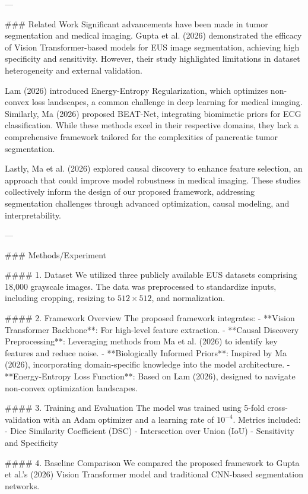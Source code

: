 ---

### Related Work
Significant advancements have been made in tumor segmentation and medical imaging. Gupta et al. (2026) demonstrated the efficacy of Vision Transformer-based models for EUS image segmentation, achieving high specificity and sensitivity. However, their study highlighted limitations in dataset heterogeneity and external validation.

Lam (2026) introduced Energy-Entropy Regularization, which optimizes non-convex loss landscapes, a common challenge in deep learning for medical imaging. Similarly, Ma (2026) proposed BEAT-Net, integrating biomimetic priors for ECG classification. While these methods excel in their respective domains, they lack a comprehensive framework tailored for the complexities of pancreatic tumor segmentation.

Lastly, Ma et al. (2026) explored causal discovery to enhance feature selection, an approach that could improve model robustness in medical imaging. These studies collectively inform the design of our proposed framework, addressing segmentation challenges through advanced optimization, causal modeling, and interpretability.

---

### Methods/Experiment

#### 1. Dataset
We utilized three publicly available EUS datasets comprising 18,000 grayscale images. The data was preprocessed to standardize inputs, including cropping, resizing to \(512 \times 512\), and normalization.

#### 2. Framework Overview
The proposed framework integrates:
- **Vision Transformer Backbone**: For high-level feature extraction.
- **Causal Discovery Preprocessing**: Leveraging methods from Ma et al. (2026) to identify key features and reduce noise.
- **Biologically Informed Priors**: Inspired by Ma (2026), incorporating domain-specific knowledge into the model architecture.
- **Energy-Entropy Loss Function**: Based on Lam (2026), designed to navigate non-convex optimization landscapes.

#### 3. Training and Evaluation
The model was trained using 5-fold cross-validation with an Adam optimizer and a learning rate of \(10^{-4}\). Metrics included:
- Dice Similarity Coefficient (DSC)
- Intersection over Union (IoU)
- Sensitivity and Specificity

#### 4. Baseline Comparison
We compared the proposed framework to Gupta et al.'s (2026) Vision Transformer model and traditional CNN-based segmentation networks.

